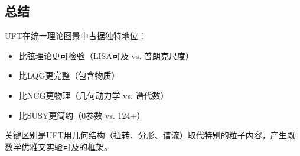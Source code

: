\subsection{总结}

UFT在统一理论图景中占据独特地位：
\begin{itemize}
    \item 比弦理论更可检验（LISA可及 vs. 普朗克尺度）
    \item 比LQG更完整（包含物质）
    \item 比NCG更物理（几何动力学 vs. 谱代数）
    \item 比SUSY更简约（0参数 vs. 124+）
\end{itemize}

关键区别是UFT用几何结构（扭转、分形、谱流）取代特别的粒子内容，产生既数学优雅又实验可及的框架。
